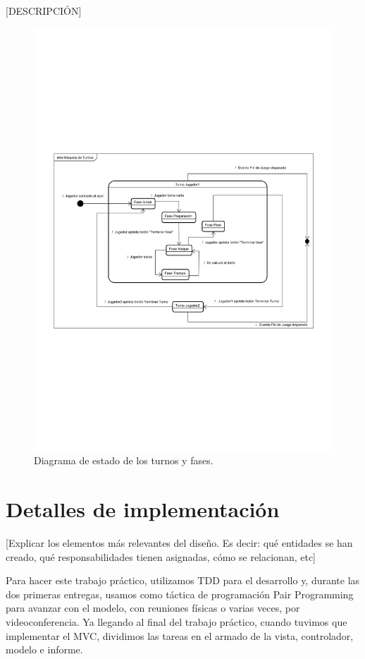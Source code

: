 [DESCRIPCIÓN]

\begin{figure}[H]
	\centering
	\includegraphics[scale=0.9]{includes/estado_Maquina_de_Turnos}
	\caption{Diagrama de estado de los turnos y fases.}
	\label{estado_Maquina_de_Turnos}
\end{figure}

\section{Detalles de implementación}
[Explicar los elementos más relevantes del diseño. Es decir: qué
entidades se han creado, qué responsabilidades tienen asignadas, cómo
se relacionan, etc]

Para hacer este trabajo práctico, utilizamos TDD para el desarrollo y, durante las dos primeras entregas, usamos como táctica de programación Pair Programming para avanzar con el modelo, con reuniones físicas o varias veces, por videoconferencia. Ya llegando al final del trabajo práctico, cuando tuvimos que implementar el MVC, dividimos las tareas en el armado de la vista, controlador, modelo e informe. 

